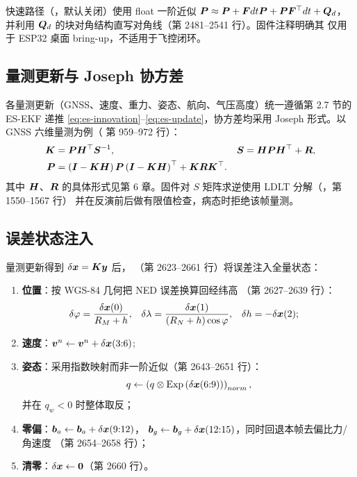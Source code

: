 快速路径（，默认关闭）使用
float 一阶近似 $\boldsymbol{P} \approx \boldsymbol{P} + \boldsymbol{F}dt\boldsymbol{P} + \boldsymbol{P}\boldsymbol{F}^\top dt + \boldsymbol{Q}_d$，
并利用 $\boldsymbol{Q}_d$ 的块对角结构直写对角线（第 2481--2541 行）。固件注释明确其
仅用于 ESP32 桌面 bring-up，不适用于飞控闭环。

\subsection{量测更新与 Joseph 协方差}

各量测更新（GNSS、速度、重力、姿态、航向、气压高度）统一遵循第 2.7 节的
ES-EKF 递推 \cref{eq:es-innovation}--\cref{eq:es-update}，协方差均采用
Joseph 形式。以 GNSS 六维量测为例（ 第 959--972 行）：
\begin{align}
  \boldsymbol{K} &= \boldsymbol{P}\boldsymbol{H}^\top\boldsymbol{S}^{-1}, &
  \boldsymbol{S} &= \boldsymbol{H}\boldsymbol{P}\boldsymbol{H}^\top + \boldsymbol{R}, \label{eq:kgain} \\
  \boldsymbol{P} &= \left(\boldsymbol{I}-\boldsymbol{K}\boldsymbol{H}\right)\boldsymbol{P}
    \left(\boldsymbol{I}-\boldsymbol{K}\boldsymbol{H}\right)^{\top} + \boldsymbol{K}\boldsymbol{R}\boldsymbol{K}^\top.
  \label{eq:joseph}
\end{align}
其中 $\boldsymbol{H}$、$\boldsymbol{R}$ 的具体形式见第 6 章。固件对 $S$ 矩阵求逆使用
LDLT 分解（，第 1550--1567 行）
并在反演前后做有限值检查，病态时拒绝该帧量测。

\subsection{误差状态注入}

量测更新得到 $\delta\boldsymbol{x} = \boldsymbol{K}\boldsymbol{y}$ 后，
（第 2623--2661 行）将误差注入全量状态：
\begin{enumerate}
  \item \textbf{位置}：按 WGS-84 几何把 NED 误差换算回经纬高
    （第 2627--2639 行）：
    \begin{align}
      \delta\varphi &= \frac{\delta\boldsymbol{x}(0)}{R_M + h}, &
      \delta\lambda &= \frac{\delta\boldsymbol{x}(1)}{(R_N + h)\cos\varphi}, &
      \delta h &= -\delta\boldsymbol{x}(2);
      \label{eq:inject-pos}
    \end{align}
  \item \textbf{速度}：$\boldsymbol{v}^n \leftarrow \boldsymbol{v}^n + \delta\boldsymbol{x}(3{:}6)$;
  \item \textbf{姿态}：采用指数映射而非一阶近似（第 2643--2651 行）：
    \begin{equation}
      q \leftarrow \left(q\otimes\operatorname{Exp}\left(\delta\boldsymbol{x}(6{:}9)\right)\right)_{norm},
      \label{eq:inject-att}
    \end{equation}
    并在 $q_w<0$ 时整体取反；
  \item \textbf{零偏}：$\boldsymbol{b}_a \leftarrow \boldsymbol{b}_a + \delta\boldsymbol{x}(9{:}12)$，
    $\boldsymbol{b}_g \leftarrow \boldsymbol{b}_g + \delta\boldsymbol{x}(12{:}15)$，同时回退本帧去偏比力/角速度
    （第 2654--2658 行）；
  \item \textbf{清零}：$\delta\boldsymbol{x} \leftarrow \boldsymbol{0}$（第 2660 行）。
\end{enumerate}


